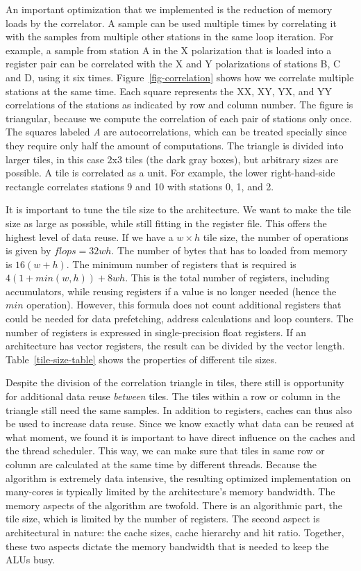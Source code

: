 \documentclass{article}
\begin{document}
An important optimization that we implemented is the reduction
of memory loads by the correlator. 
A sample can be used multiple times by correlating it
with the samples from multiple other stations in the same loop iteration.
For example, a sample from station A in the X polarization
that is loaded into a register pair can be correlated with the X and
Y polarizations of stations B, C and D, using it six times. 
Figure~\ref{fig-correlation} shows how we correlate multiple
stations at the same time. Each square represents the XX, XY,
YX, and YY correlations of the stations as indicated by row and
column number. The figure is triangular, because we compute
the correlation of each pair of stations only once. The squares labeled \emph{A} are
autocorrelations, which can be treated specially since they require only half
the amount of computations.
The triangle is divided into larger tiles, in this case 
2x3 tiles (the dark gray boxes), but arbitrary sizes are possible.
A tile is correlated as a unit. For example, the lower
right-hand-side rectangle correlates stations 9 and 10 with stations
0, 1, and 2.

It is important to tune the tile size to the architecture. We want to
make the tile size as large as possible, while still fitting in the
register file. This offers the highest level of data reuse.  
If we have a $w \times h$ tile size, the number of operations is given by $flops = 32wh$.
The number of bytes that has to loaded from memory is $16(w+h)$.
The minimum number of registers that is required is $4 (1 + min(w,h)) + 8 w h$.
This is the total number of registers, including accumulators, while reusing
registers if a value is no longer needed (hence the $min$ operation). However,
this formula does not count additional registers that could be needed for data prefetching,
address calculations and loop counters.
The number of registers is expressed in single-precision float registers. If an architecture has vector
registers, the result can be divided by the vector length.
Table~\ref{tile-size-table} shows the properties of different tile sizes. 

Despite the division of the correlation triangle in tiles, there
still is opportunity for additional data reuse \emph{between} tiles. 
The tiles
within a row or column in the triangle still need the same samples.
In
addition to registers, caches can thus also be used to increase data
reuse.  Since we know exactly what data can be reused at what moment, we
found it is important to have direct influence on the caches and the thread scheduler.  This
way, we can make sure that tiles in same row or column are calculated
at the same time by different threads. 
Because the algorithm is
extremely data intensive, the resulting optimized implementation on
many-cores is typically limited by the architecture's memory
bandwidth. The memory aspects of the algorithm are twofold.
There is an algorithmic part, the tile size, which is limited
by the number of registers. The second aspect is architectural in nature: the cache
sizes, cache hierarchy and hit ratio. Together, these two aspects dictate the
memory bandwidth that is needed to keep the ALUs busy.
\end{document}

